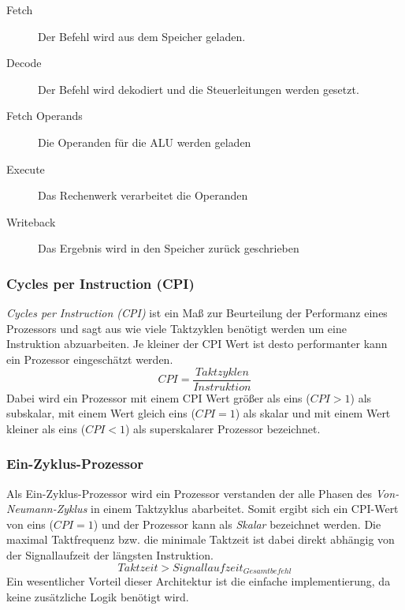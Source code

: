                 \begin{description}
                    \item[Fetch] Der Befehl wird aus dem Speicher geladen.
                    \item[Decode] Der Befehl wird dekodiert und die Steuerleitungen werden gesetzt.
                    \item[Fetch Operands] Die Operanden für die ALU werden geladen 
                    \item[Execute] Das Rechenwerk verarbeitet die Operanden
                    \item[Writeback] Das Ergebnis wird in den Speicher zurück geschrieben
                \end{description}


            \subsubsection{Cycles per Instruction (CPI)}
                \textit{Cycles per Instruction (CPI)} ist ein Maß zur Beurteilung der Performanz eines Prozessors
                und sagt aus wie viele Taktzyklen benötigt werden um eine Instruktion abzuarbeiten.
                Je kleiner der CPI Wert ist desto performanter kann ein Prozessor eingeschätzt werden.
                \begin{equation}
                    CPI = \frac{Taktzyklen}{Instruktion}
                \end{equation}
                Dabei wird ein Prozessor mit einem CPI Wert größer als eins ($CPI > 1$) als subskalar,
                mit einem Wert gleich eins ($CPI = 1$) als skalar und mit einem Wert kleiner als eins
                ($CPI < 1$) als superskalarer Prozessor bezeichnet.
   

            \subsubsection{Ein-Zyklus-Prozessor}
                Als Ein-Zyklus-Prozessor wird ein Prozessor verstanden der alle Phasen des \textit{Von-Neumann-Zyklus}
                in einem Taktzyklus abarbeitet.
                Somit ergibt sich ein CPI-Wert von eins ($CPI = 1$) und der Prozessor kann als \textit{Skalar} bezeichnet werden.
                Die maximal Taktfrequenz bzw. die minimale Taktzeit ist dabei direkt abhängig von der Signallaufzeit
                der längsten Instruktion.
                \begin{equation}
                    Taktzeit > Signallaufzeit_{Gesamtbefehl}
                \end{equation}
                Ein wesentlicher Vorteil dieser Architektur ist die einfache implementierung, da
                keine zusätzliche Logik benötigt wird.

